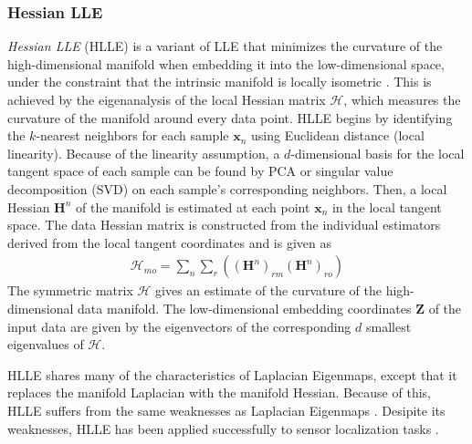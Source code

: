 \subsubsection{Hessian LLE} \label{sec:Hessian_LLE}
\textit{Hessian LLE} (HLLE) \citep{Donoho2003HessianEigenmaps} is a variant of LLE that minimizes the curvature of the high-dimensional manifold when embedding it into the low-dimensional space, under the constraint that the intrinsic manifold is locally isometric \citep{VanDerMaaten2009DRReview,Thorstensen2009ManifoldThesis}.  This is achieved by the eigenanalysis of the local Hessian matrix $\mathcal{H}$, which measures the curvature of the manifold around every data point.  HLLE begins by identifying the $k$-nearest neighbors for each sample $\bm{x}_{n}$ using Euclidean distance (local linearity).  Because of the linearity assumption, a $d$-dimensional basis for the local tangent space of each sample can be found by PCA or singular value decomposition (SVD) on each sample's corresponding neighbors.   Then, a local Hessian $\bm{H}^{n}$ of the manifold is estimated at each point $\bm{x}_{n}$ in the local tangent space.  The data Hessian matrix is constructed from the individual estimators derived from the local tangent coordinates and is given as
\begin{align}
	\mathcal{H}_{mo} = \sum_{n}\sum_{r}((\bm{H}^{n})_{rm}(\bm{H}^{n})_{ro})
\end{align}
The symmetric matrix $\mathcal{H}$ gives an estimate of the curvature of the high-dimensional data manifold.  The low-dimensional embedding coordinates $\bm{Z}$ of the input data are given by the eigenvectors of the corresponding $d$ smallest eigenvalues of $\mathcal{H}$.

HLLE shares many of the characteristics of Laplacian Eigenmaps, except that it replaces the manifold Laplacian with the manifold Hessian.  Because of this, HLLE suffers from the same weaknesses as Laplacian Eigenmaps \citep{VanDerMaaten2009DRReview}.  Desipite its weaknesses, HLLE has been applied successfully to sensor localization tasks \citep{Patwari2004HLLESensorNetworks}.

